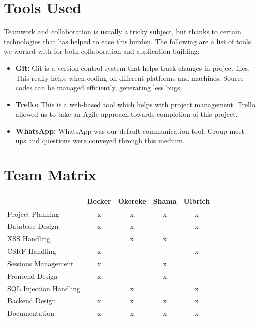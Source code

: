 \documentclass[12pt,a4paper]{article}
\begin{document}
\begin{flushleft}
	
		
	\section{Tools Used}
	Teamwork and collaboration is usually a tricky subject, but thanks to certain technologies that has helped to ease this burden. The following are a list of tools we worked with for both collaboration and application building:
	\begin{itemize}
		\item \textbf{Git:} Git is a version control system that helps track changes in project files. This really helps when coding on different platforms and machines. Source codes can be managed efficiently, generating less bugs.
		
		\item \textbf{Trello:} This is a web-based tool which helps with project management. Trello allowed us to take an Agile approach towards completion of this project.
		
		\item \textbf{WhatsApp:} WhatsApp was our default communication tool. Group meet-ups and questions were conveyed through this medium.
			
	\end{itemize}
	
	
	\section {Team Matrix}
	\begin{tabular}{|l|c|c|c|c|}
		\hline
		 & Becker & Okereke & Shama & Ulbrich \\ \hline
		 Project Planning & x & x & x & x \\ \hline
		 Database Design & x & x &  & x \\ \hline
		 XSS Handling &  & x & x &   \\ \hline
		 CSRF Handling & x &  &  & x  \\ \hline
		 Sessions Management & x &  & x &  \\ \hline
		 Frontend Design & x &  & x &  \\ \hline
		 SQL Injection Handling &  & x &  & x \\ \hline
		 Backend Design & x & x & x & x \\ \hline
		 Documentation & x & x & x & x \\ \hline
	\end{tabular}
	

\end{flushleft}
\end{document}
